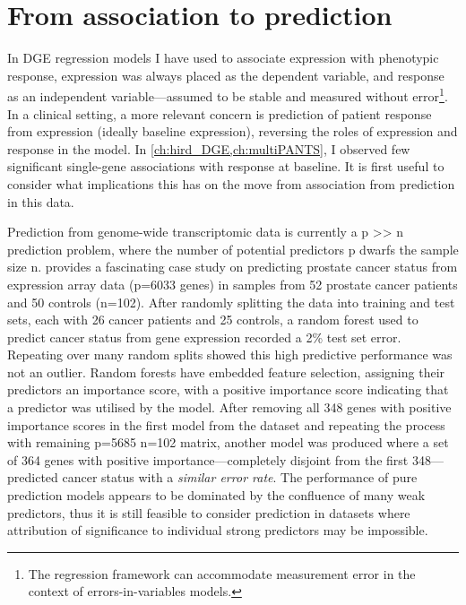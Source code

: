 \section{From association to prediction}

In \gls{DGE} regression models I have used to associate expression with phenotypic response,
expression was always placed as the dependent variable, 
and response as an independent variable---assumed to be stable and measured without error\footnote{The regression framework can accommodate measurement error in the context of errors-in-variables models.}.
In a clinical setting, a more relevant concern is prediction of patient response from expression (ideally baseline expression),
reversing the roles of expression and response in the model.
In \cref{ch:hird_DGE,ch:multiPANTS},
I observed few significant single-gene associations with response at baseline.
It is first useful to consider what implications this has on the move from association from prediction in this data.

Prediction from genome-wide transcriptomic data is currently a p >> n prediction problem,
where the number of potential predictors p dwarfs the sample size n.
\textcite{efron2020PredictionEstimationAttribution} provides a fascinating case study on predicting prostate cancer status from expression array data (p=6033 genes) in 
samples from 52 prostate cancer patients and 50 controls (n=102).
After randomly splitting the data into training and test sets, each with 26 cancer patients and 25 controls,
a random forest used to predict cancer status from gene expression recorded a 2\% test set error.
Repeating over many random splits showed this high predictive performance was not an outlier.
Random forests have embedded feature selection, assigning their predictors an importance score, 
with a positive importance score indicating that a predictor was utilised by the model.
After removing all 348 genes with positive importance scores in the first model from the dataset and repeating the process with remaining p=5685 n=102 matrix,
another model was produced where a set of 364 genes with positive importance---completely disjoint from the first 348---predicted cancer status with a \emph{similar error rate}.
The performance of pure prediction models appears to be dominated by the confluence of many weak predictors,
thus it is still feasible to consider prediction in datasets where attribution of significance to individual strong predictors may be impossible.

